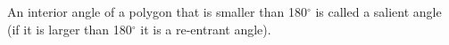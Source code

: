 An interior angle of a polygon that is smaller than 180$^{\circ}$ is
called a salient angle (if it is larger than 180$^{\circ}$ it is a
re-entrant angle).